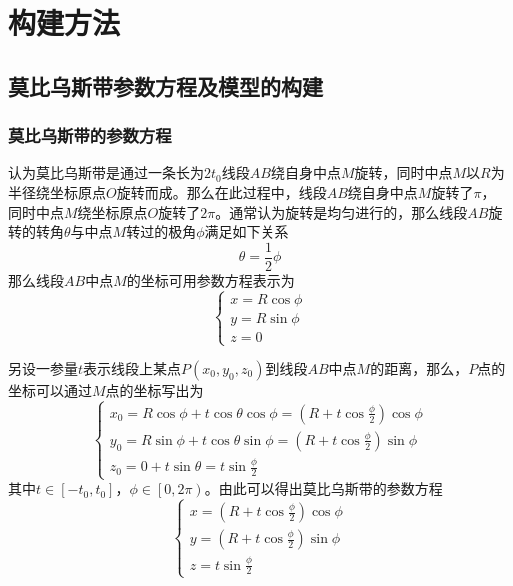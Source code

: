 
\chapter{构建方法}

\section{莫比乌斯带参数方程及模型的构建}
\subsection{莫比乌斯带的参数方程\cite{ref1}}
认为莫比乌斯带是通过一条长为$2t_0$线段$AB$绕自身中点$M$旋转，同时中点$M$以$R$为半径绕坐标原点$O$旋转而成。那么在此过程中，线段$AB$绕自身中点$M$旋转了$\pi$，
同时中点$M$绕坐标原点$O$旋转了$2\pi$。通常认为旋转是均匀进行的，那么线段$AB$旋转的转角$\theta$与中点$M$转过的极角$\phi$满足如下关系
\begin{equation}
  \theta=\frac{1}{2}\phi
\end{equation}
那么线段$AB$中点$M$的坐标可用参数方程表示为
\begin{equation}
  \begin{cases}
    x=R\cos \phi\\
    y=R\sin\phi\\
    z=0
  \end{cases}
\end{equation}

另设一参量$t$表示线段上某点$P\left(x_0,y_0,z_0\right)$到线段$AB$中点$M$的距离，那么，$P$点的坐标可以通过$M$点的坐标写出为
\begin{equation}
  \begin{cases}
    x_0=R\cos \phi+t\cos\theta\cos\phi=\left(R+t\cos\frac{\phi}{2}\right)\cos\phi\\
    y_0=R\sin\phi+t\cos\theta\sin\phi=\left(R+t\cos\frac{\phi}{2}\right)\sin\phi\\
    z_0=0+t\sin\theta=t\sin\frac{\phi}{2}
  \end{cases}
\end{equation}
其中$t\in\left[-t_0,t_0\right]$，$\phi\in\left[0,2\pi\right)$。由此可以得出莫比乌斯带的参数方程
\begin{equation}\label{canshufangcheng}
  \begin{cases}
    x=\left(R+t\cos\frac{\phi}{2}\right)\cos\phi\\
    y=\left(R+t\cos\frac{\phi}{2}\right)\sin\phi\\
    z=t\sin\frac{\phi}{2}
  \end{cases}
\end{equation}

